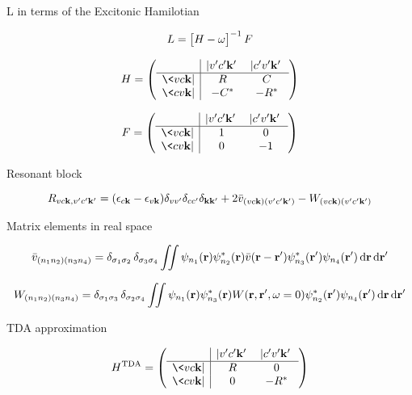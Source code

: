 \documentclass[a4paper,reqno,11pt,twoside]{book}
\begin{document}
 L in terms of the Excitonic Hamilotian

\begin{equation}
L = \bigl [ H-\ww \bigr]^{-1}\,F
\end{equation}

$$ 
H =
\left( 
\begin{array}{c|cc} 
  &   |v'c'\kk'\> & |c'v'\kk'\>     \\ \hline 
\<vc\kk|  & R  &  C  \\ %
\<cv\kk|  &  -C^* & -R^*   \\
\end{array}
\right) 
$$

$$ 
F =
\left( 
\begin{array}{c|cc} 
  &   |v'c'\kk'\> & |c'v'\kk'\>     \\ \hline 
\<vc\kk|  & 1  &  0   \\ %
\<cv\kk|  & 0  & -1   \\
\end{array}
\right) 
$$

Resonant block

\begin{equation}
R_{vc\kk,v'c'\kk'} = 
( \ee_{c\kk} - \ee_{v\kk} )\delta_{vv'}\delta_{cc'}\delta_{\kk\kk'} + 
2 \bar v_{(vc\kk)(v'c'\kk')} - W_{(vc\kk)(v'c'\kk')}
\end{equation}

Matrix elements in real space


\begin{equation}
{\bar v}_{(n_1 n_2) (n_3 n_4)} =
\delta_{\sigma_1 \sigma_2}\, \delta_{\sigma_3 \sigma_4}
\iint \psi_{n_1}(\rr) \psi^*_{n_2}(\rr) {\bar v(\rr-\rr')} \psi_{n_3}^*(\rr') \psi_{n_4}(\rr') \dd \rr \dd \rr'
\end{equation}

\begin{equation}
W_{(n_1 n_2) (n_3 n_4)} =
\delta_{\sigma_1 \sigma_3}\, \delta_{\sigma_2 \sigma_4}
\iint \psi_{n_1}(\rr) \psi^*_{n_3}(\rr) {W(\rr,\rr',\ww=0)} \psi^*_{n_2}(\rr') \psi_{n_4}(\rr') \dd \rr \dd \rr'
\end{equation}


TDA approximation

\begin{equation}\nonumber
H^{\text{TDA}} =
\left( 
\begin{array}{c|cc} 
  &   |v'c'\kk'\> & |c'v'\kk'\>     \\ \hline 
\<vc\kk|  & R  &  0  \\ %
\<cv\kk|  &  0 & -R^*   \\
\end{array}
\right) 
\end{equation}
\end{document}

